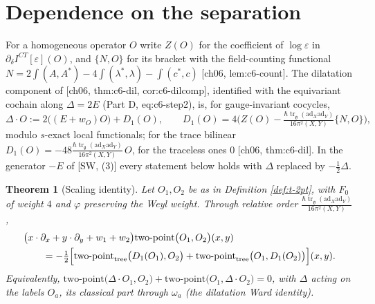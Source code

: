 \documentclass[11pt]{report}
\theoremstyle{plain}
\newtheorem{theorem}{Theorem}[chapter]
\theoremstyle{definition}
\numberwithin{equation}{chapter}
\newcommand{\unit}{\tfrac{\hbar\operatorname{tr}_{\mathfrak g}(\mathrm{ad}_X\mathrm{ad}_Y)}{16\pi^2(X,Y)}}
\newcommand{\TP}[2]{\mathrm{two\mbox{-}point}\big(#1,#2\big)}
\newcommand{\TPz}[2]{\mathrm{two\mbox{-}point}_{\rm tree}\big(#1,#2\big)}
\begin{document}
\section{Dependence on the separation}

For a homogeneous operator $O$ write $Z(O)$ for the coefficient of $\log\varepsilon$ in $\partial_\delta I^{CT}[\varepsilon](O)$, and $\{N,O\}$ for its bracket with the field-counting functional $N=2\int(A,A^*)-4\int(\lambda^*,\lambda)-\int(c^*,c)$ [ch06, lem:c6-count]. The dilatation component of [ch06, thm:c6-dil, cor:c6-dilcomp], identified with the equivariant cochain along $\Delta=2E$ (Part D, eq:c6-step2), is, for gauge-invariant cocycles,
\begin{equation}
\Delta\cdot O:=2\big((E+w_O)O\big)+D_1(O),\qquad D_1(O)=4\Big(Z(O)-\unit\{N,O\}\Big),
\label{eq:t-D1}
\end{equation}
modulo $s$-exact local functionals; for the trace bilinear $D_1(O)=-48\unit\,O$, for the traceless ones $0$ [ch06, thm:c6-dil]. In the generator $-E$ of [SW, (3)] every statement below holds with $\Delta$ replaced by $-\tfrac12\Delta$.

\begin{theorem}[Scaling identity]
\label{thm:t-scaling}
Let $O_1,O_2$ be as in Definition \ref{def:t-2pt}, with $F_0$ of weight $4$ and $\varphi$ preserving the Weyl weight. Through relative order $\unit$,
\begin{equation}
\begin{aligned}
&\big(x\cdot\partial_x+y\cdot\partial_y+w_1+w_2\big)\TP{O_1}{O_2}(x,y)\\
&\qquad=-\tfrac12\Big[\TPz{D_1(O_1)}{O_2}+\TPz{O_1}{D_1(O_2)}\Big](x,y).
\end{aligned}
\label{eq:t-scaling}
\end{equation}
Equivalently, $\TP{\Delta\cdot O_1}{O_2}+\TP{O_1}{\Delta\cdot O_2}=0$, with $\Delta$ acting on the labels $O_a$, its classical part through $\omega_a$ (the dilatation Ward identity).
\end{theorem}
\end{document}
